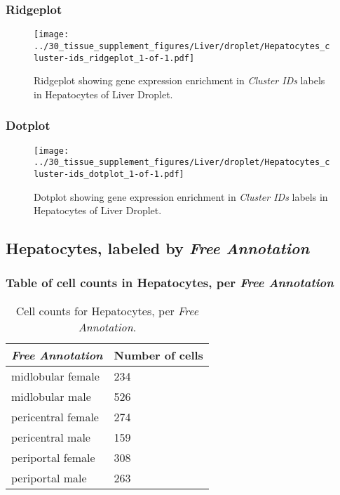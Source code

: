 \clearpage

\subsubsection{Ridgeplot}
\begin{figure}[h]
\centering
\texttt{[image: ../30\_tissue\_supplement\_figures/Liver/droplet/Hepatocytes\_cluster-ids\_ridgeplot\_1-of-1.pdf]}

\caption{ Ridgeplot  showing gene expression enrichment in \emph{Cluster IDs} labels in Hepatocytes of Liver Droplet. }
\end{figure}


\clearpage

\subsubsection{Dotplot}
\begin{figure}[h]
\centering
\texttt{[image: ../30\_tissue\_supplement\_figures/Liver/droplet/Hepatocytes\_cluster-ids\_dotplot\_1-of-1.pdf]}

\caption{ Dotplot  showing gene expression enrichment in \emph{Cluster IDs} labels in Hepatocytes of Liver Droplet. }
\end{figure}


\clearpage

\subsection{Hepatocytes, labeled by \emph{Free Annotation}}
\subsubsection{Table of cell counts in Hepatocytes, per \emph{Free Annotation}}\begin{table}[h]
\centering
\label{my-label}
\begin{tabular}{@{}ll@{}}
\toprule

\emph{Free Annotation}& Number of cells \\ \midrule
midlobular female & 234 \\

midlobular male & 526 \\

pericentral female & 274 \\

pericentral male & 159 \\

periportal female & 308 \\

periportal male & 263 \\
\bottomrule
\end{tabular}
\caption{Cell counts for Hepatocytes, per \emph{Free Annotation}.}
\end{table}

